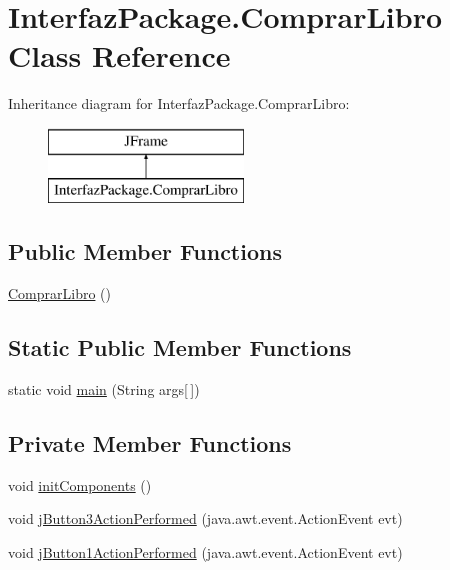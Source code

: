 \hypertarget{class_interfaz_package_1_1_comprar_libro}{}\section{Interfaz\+Package.\+Comprar\+Libro Class Reference}
\label{class_interfaz_package_1_1_comprar_libro}
Inheritance diagram for Interfaz\+Package.\+Comprar\+Libro\+:\begin{figure}[H]
\begin{center}
\leavevmode
\includegraphics[height=2.000000cm]{class_interfaz_package_1_1_comprar_libro}
\end{center}
\end{figure}
\subsection*{Public Member Functions}
\begin{DoxyCompactItemize}
\item 
\mbox{\hyperlink{class_interfaz_package_1_1_comprar_libro_aa2b72bc79a74662e97fd03629929e6b6}{Comprar\+Libro}} ()
\end{DoxyCompactItemize}
\subsection*{Static Public Member Functions}
\begin{DoxyCompactItemize}
\item 
static void \mbox{\hyperlink{class_interfaz_package_1_1_comprar_libro_a7459e903a1ffbe1b8e163dccfe5dba44}{main}} (String args\mbox{[}$\,$\mbox{]})
\end{DoxyCompactItemize}
\subsection*{Private Member Functions}
\begin{DoxyCompactItemize}
\item 
void \mbox{\hyperlink{class_interfaz_package_1_1_comprar_libro_af7b7832e99e461847ab13c76f089b9ff}{init\+Components}} ()
\item 
void \mbox{\hyperlink{class_interfaz_package_1_1_comprar_libro_a27ea605530e2903b8f6b112e28f174af}{j\+Button3\+Action\+Performed}} (java.\+awt.\+event.\+Action\+Event evt)
\item 
void \mbox{\hyperlink{class_interfaz_package_1_1_comprar_libro_aebce4e6cc2e6631bb667ecf27132414a}{j\+Button1\+Action\+Performed}} (java.\+awt.\+event.\+Action\+Event evt)
\end{DoxyCompactItemize}

